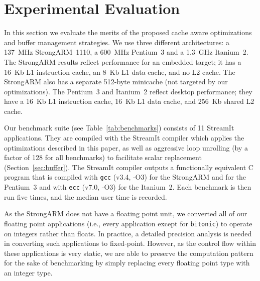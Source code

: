 \section{Experimental Evaluation}
\label{sec:evaluation}

In this section we evaluate the merits of the proposed cache aware
optimizations and buffer management strategies.  We use three
different architectures: a 137~MHz StrongARM~1110, a 600~MHz Pentium~3
and a 1.3~GHz Itanium~2. The StrongARM results reflect performance for
an embedded target; it has a 16~Kb L1 instruction cache, an 8~Kb L1 data
cache, and no L2 cache.  The StrongARM also has a separate 512-byte
minicache (not targeted by our optimizations).  The Pentium~3 and
Itanium~2 reflect desktop performance; they have a 16~Kb L1 instruction
cache, 16~Kb L1 data cache, and 256~Kb shared L2 cache.

Our benchmark suite (see Table~\ref{tab:benchmarks}) consists of
11 StreamIt applications. They are compiled with the StreamIt
compiler which applies the optimizations described in this paper, as
well as aggressive loop unrolling (by a factor of 128 for all
benchmarks) to facilitate scalar replacement
(Section~\ref{sec:buffer}).  The StreamIt compiler outputs a
functionally equivalent C program that is compiled with \texttt{gcc}
(v3.4, -O3) for the StrongARM and for the Pentium~3 and with
\texttt{ecc} (v7.0, -O3) for the Itanium~2.  Each benchmark is then
run five times, and the median user time is recorded.

As the StrongARM does not have a floating point unit, we converted all
of our floating point applications (i.e., every application except for
{\tt bitonic}) to operate on integers rather than floats.  In
practice, a detailed precision analysis is needed in converting such
applications to fixed-point.  However, as the control flow within
these applications is very static, we are able to preserve the
computation pattern for the sake of benchmarking by simply replacing
every floating point type with an integer type.

